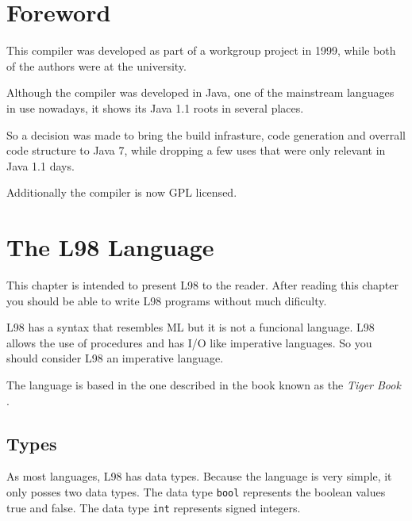 \documentclass[a4paper, 11pt]{report}
\newcommand{\keyword}[1]{\texttt{#1}}
\begin{document}
\begin{titlepage}

\vspace{2cm}

\vspace{3cm}

\end{titlepage}

\tableofcontents

\chapter{Foreword}

This compiler was developed as part of a workgroup project in 1999, while both
of the authors were at the university.

Although the compiler was developed in Java, one of the mainstream languages in
use nowadays, it shows its Java 1.1 roots in several places.

So a decision was made to bring the build infrasture, code generation and overrall
code structure to Java 7, while dropping a few uses that were only relevant in Java
1.1 days.

Additionally the compiler is now GPL licensed.

\chapter{The L98 Language}


This chapter is intended to present L98 to the reader. After reading this
chapter you should be able to write L98 programs without much dificulty.

L98 has a syntax that resembles ML but it is not a funcional language. L98
allows the use of procedures and has I/O like imperative languages. So you
should consider L98 an imperative language.

The language is based in the one described in the book known as the \emph{Tiger
Book} \cite{tiger}.

\section{Types}

As most languages, L98 has data types. Because the language is very simple, it
only posses two data types. The data type \keyword{bool} represents the boolean
values true and false. The data type \keyword{int} represents signed integers.
\end{document}
